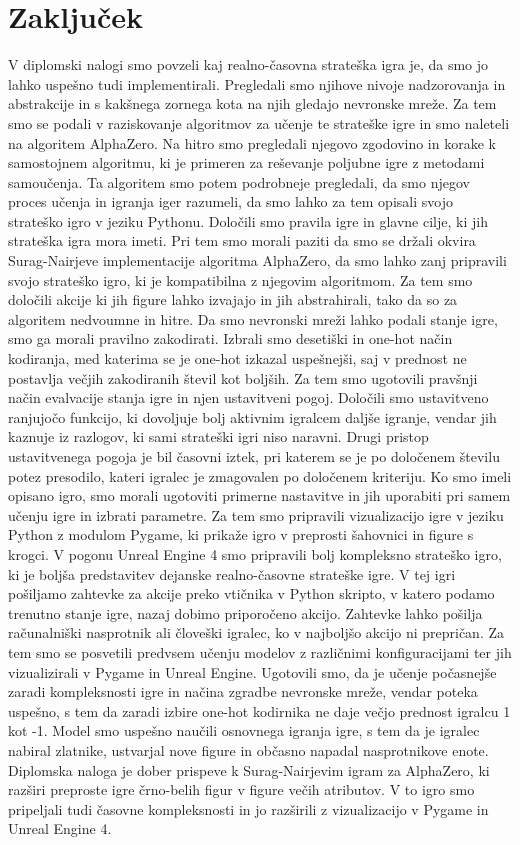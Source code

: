 \documentclass[a4paper, 12pt]{book}
\begin{document}
\chapter{Zaključek}
\label{chzakljucek}
V diplomski nalogi smo povzeli kaj realno-časovna strateška igra je, da smo jo lahko uspešno tudi implementirali.
Pregledali smo njihove nivoje nadzorovanja in abstrakcije in s kakšnega zornega kota na njih gledajo nevronske mreže.
Za tem smo se podali v raziskovanje algoritmov za učenje te strateške igre in smo naleteli na algoritem AlphaZero.
Na hitro smo pregledali njegovo zgodovino in korake k samostojnem algoritmu, ki je primeren za reševanje poljubne igre z metodami samoučenja.
Ta algoritem smo potem podrobneje pregledali, da smo njegov proces učenja in igranja iger razumeli, da smo lahko za tem opisali svojo strateško igro v jeziku Pythonu.
Določili smo pravila igre in glavne cilje, ki jih strateška igra mora imeti.
Pri tem smo morali paziti da smo se držali okvira Surag-Nairjeve implementacije algoritma AlphaZero, da smo lahko zanj pripravili svojo strateško igro, ki je kompatibilna z njegovim algoritmom.
Za tem smo določili akcije ki jih figure lahko izvajajo in jih abstrahirali, tako da so za algoritem nedvoumne in hitre.
Da smo nevronski mreži lahko podali stanje igre, smo ga morali pravilno zakodirati.
Izbrali smo desetiški in one-hot način kodiranja, med katerima se je one-hot izkazal uspešnejši, saj v prednost ne postavlja večjih zakodiranih števil kot boljših.
Za tem smo ugotovili pravšnji način evalvacije stanja igre in njen ustavitveni pogoj.
Določili smo ustavitveno ranjujočo funkcijo, ki dovoljuje bolj aktivnim igralcem daljše igranje, vendar jih kaznuje iz razlogov, ki sami strateški igri niso naravni.
Drugi pristop ustavitvenega pogoja je bil časovni iztek, pri katerem se je po določenem številu potez presodilo, kateri igralec je zmagovalen po določenem kriteriju.
Ko smo imeli opisano igro, smo morali ugotoviti primerne nastavitve in jih uporabiti pri samem učenju igre in izbrati parametre.
Za tem smo pripravili vizualizacijo igre v jeziku Python z modulom Pygame, ki prikaže igro v preprosti šahovnici in figure s krogci.
V pogonu Unreal Engine 4 smo pripravili bolj kompleksno strateško igro, ki je boljša predstavitev dejanske realno-časovne strateške igre.
V tej igri pošiljamo zahtevke za akcije preko vtičnika v Python skripto, v katero podamo trenutno stanje igre, nazaj dobimo priporočeno akcijo.
Zahtevke lahko pošilja računalniški nasprotnik ali človeški igralec, ko v najboljšo akcijo ni prepričan.
Za tem smo se posvetili predvsem učenju modelov z različnimi konfiguracijami ter jih vizualizirali v Pygame in Unreal Engine.
Ugotovili smo, da je učenje počasnejše zaradi kompleksnosti igre in načina zgradbe nevronske mreže, vendar poteka uspešno, s tem da zaradi izbire one-hot kodirnika ne daje večjo prednost igralcu 1 kot -1.
Model smo uspešno naučili osnovnega igranja igre, s tem da je igralec nabiral zlatnike, ustvarjal nove figure in občasno napadal nasprotnikove enote.
Diplomska naloga je dober prispeve k Surag-Nairjevim igram za AlphaZero, ki razširi preproste igre črno-belih figur v figure večih atributov.
V to igro smo pripeljali tudi časovne kompleksnosti in jo razširili z vizualizacijo v Pygame in Unreal Engine 4.
\end{document}
